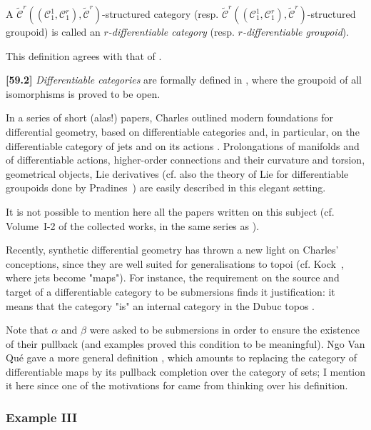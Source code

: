 \documentclass[a4paper,fleqn]{article}
\theoremstyle{plain}
\theoremstyle{definition}
\newenvironment{definition}[1]
  {\renewcommand\theinnerdefinition{#1}\innerdefinition}
  {\endinnerdefinition}
\newenvironment{longcomm}[1]
  {\noindent\textbf{[#1]}\rmfamily}
  {}
\newcommand{\oldpage}[1]{{\marginpar{\footnotesize$\bigg\vert$\,\,\,\,\textit{p.~#1}}}}
\newcommand{\CC}{\mathcal{C}}
\newcommand{\tCC}{\widetilde{\CC}}
\begin{document}
\oldpage{387}

\begin{definition}{8}
\label{definition:ii-8}
  A $\tCC^r((\CC_1^1,\CC_1^r),\tCC^r)$-structured category (resp. $\tCC^r((\CC_1^1,\CC_1^r),\tCC^r)$-structured groupoid) is called an \emph{$r$-differentiable category} (resp. \emph{$r$-differentiable groupoid}).
\end{definition}

This definition agrees with that of \cite{3b}.

\begin{longcomm}{59.2}
  \emph{Differentiable categories} are formally defined in \cite{coll50}, where the groupoid of all isomorphisms is proved to be open.

  In a series of short (alas!) papers, Charles outlined modern foundations for differential geometry, based on differentiable categories and, in particular, on the differentiable category of jets and on its actions \cite{coll46,coll78,coll101,coll103,coll105,coll116}.
  Prolongations of manifolds and of differentiable actions, higher-order connections and their curvature and torsion, geometrical objects, Lie derivatives (cf. also the theory of Lie for differentiable groupoids done by Pradines~\cite{comm85}) are easily described in this elegant setting.

  It is not possible to mention here all the papers written on this subject (cf. Volume~I-2 of the collected works, in the same series as \cite{coll}).

  Recently, synthetic differential geometry has thrown a new light on Charles' conceptions, since they are well suited for generalisations to topoi (cf. Kock~\cite{comm61}, where jets become "maps").
  For instance, the requirement on the source and target of a differentiable category to be submersions finds it justification: it means that the category "is" an internal category in the Dubuc topos \cite{comm27}.

  Note that $\alpha$ and $\beta$ were asked to be submersions in order to ensure the existence of their pullback (and examples proved this condition to be meaningful).
  Ngo Van Qué gave a more general definition \cite{comm80}, which amounts to replacing the category of differentiable maps by its pullback completion over the category of sets;
  I mention it here since one of the motivations for \cite{coll107} came from thinking over his definition.
\end{longcomm}


\subsubsection*{Example III}
\label{section:ii.3.iii}
\end{document}
